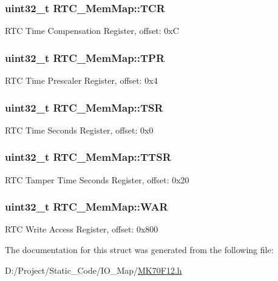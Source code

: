 \subsubsection[{T\+C\+R}]{\setlength{\rightskip}{0pt plus 5cm}uint32\+\_\+t R\+T\+C\+\_\+\+Mem\+Map\+::\+T\+C\+R}\label{struct_r_t_c___mem_map_ab816b0540497796070202cd2f5bc10ed}
R\+T\+C Time Compensation Register, offset\+: 0x\+C \hypertarget{struct_r_t_c___mem_map_a32641b62d548255bdf2164b457a2aaeb}{}
\subsubsection[{T\+P\+R}]{\setlength{\rightskip}{0pt plus 5cm}uint32\+\_\+t R\+T\+C\+\_\+\+Mem\+Map\+::\+T\+P\+R}\label{struct_r_t_c___mem_map_a32641b62d548255bdf2164b457a2aaeb}
R\+T\+C Time Prescaler Register, offset\+: 0x4 \hypertarget{struct_r_t_c___mem_map_a4ca4d2878d99736cbff0e8b107a275f2}{}
\subsubsection[{T\+S\+R}]{\setlength{\rightskip}{0pt plus 5cm}uint32\+\_\+t R\+T\+C\+\_\+\+Mem\+Map\+::\+T\+S\+R}\label{struct_r_t_c___mem_map_a4ca4d2878d99736cbff0e8b107a275f2}
R\+T\+C Time Seconds Register, offset\+: 0x0 \hypertarget{struct_r_t_c___mem_map_a15cd6b1d2a7664e4280746a810d2583f}{}
\subsubsection[{T\+T\+S\+R}]{\setlength{\rightskip}{0pt plus 5cm}uint32\+\_\+t R\+T\+C\+\_\+\+Mem\+Map\+::\+T\+T\+S\+R}\label{struct_r_t_c___mem_map_a15cd6b1d2a7664e4280746a810d2583f}
R\+T\+C Tamper Time Seconds Register, offset\+: 0x20 \hypertarget{struct_r_t_c___mem_map_aa3d2abe1fdd440a05339c38d377a2ee6}{}
\subsubsection[{W\+A\+R}]{\setlength{\rightskip}{0pt plus 5cm}uint32\+\_\+t R\+T\+C\+\_\+\+Mem\+Map\+::\+W\+A\+R}\label{struct_r_t_c___mem_map_aa3d2abe1fdd440a05339c38d377a2ee6}
R\+T\+C Write Access Register, offset\+: 0x800 

The documentation for this struct was generated from the following file\+:\begin{DoxyCompactItemize}
\item 
D\+:/\+Project/\+Static\+\_\+\+Code/\+I\+O\+\_\+\+Map/\hyperlink{_m_k70_f12_8h}{M\+K70\+F12.\+h}\end{DoxyCompactItemize}
